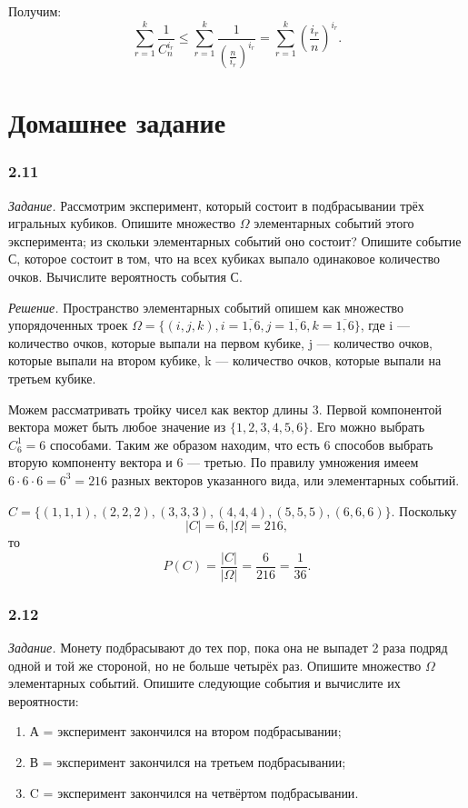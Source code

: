 Получим:
$$\sum \limits_{r=1}^k \frac{1}{C_n^{i_r}} \leq
\sum \limits_{r=1}^k \frac{1}{\left( \frac{n}{i_r} \right)^{i_r}} =
\sum \limits_{r=1}^k \left( \frac{i_r}{n} \right)^{i_r}. $$

\section*{Домашнее задание}

\subsubsection*{2.11}

\textit{Задание.} Рассмотрим эксперимент, который состоит в подбрасывании трёх игральных кубиков.
Опишите множество $ \Omega $ элементарных событий этого эксперимента; из скольки элементарных событий оно состоит?
Опишите событие С, которое состоит в том, что на всех кубиках выпало одинаковое количество очков.
Вычислите вероятность события С.

\textit{Решение.} Пространство элементарных событий опишем как множество упорядоченных троек
$ \Omega = \{ \left( i, j, k \right),
i = \overline{ 1, 6 },
j = \overline{ 1, 6 },
k = \overline{ 1, 6 } \} $,
где i --- количество очков, которые выпали на первом кубике,
j --- количество очков, которые выпали на втором кубике,
k --- количество очков, которые выпали на третьем кубике.

Можем рассматривать тройку чисел как вектор длины 3.
Первой компонентой вектора может быть любое значение из $ \{ 1, 2, 3, 4, 5, 6 \} $.
Его можно выбрать $ C_6^1 = 6 $ способами.
Таким же образом находим, что есть 6 способов выбрать вторую компоненту вектора и 6 --- третью.
По правилу умножения имеем $ 6 \cdot 6 \cdot 6 = 6^3 = 216 $ разных векторов указанного вида, или элементарных событий.

$ C = \{ (1, 1, 1), (2, 2, 2), (3, 3, 3), (4, 4, 4), (5, 5, 5), (6, 6, 6) \} $.
Поскольку
$$ |C| = 6,
|\Omega| = 216, $$
то
$$ P(C) =
\frac{ |C| }{ |\Omega| } =
\frac{ 6 }{ 216 } =
\frac{ 1 }{ 36 }.$$

\subsubsection*{2.12}

\textit{Задание.} Монету подбрасывают до тех пор, пока она не выпадет 2 раза подряд одной и той же стороной, но не больше четырёх раз.
Опишите множество $ \Omega $ элементарных событий.
Опишите следующие события и вычислите их вероятности:
\begin{enumerate}[label=\alph*)]
\item А = { эксперимент закончился на втором подбрасывании};
\item В = { эксперимент закончился на третьем подбрасывании};
\item C = { эксперимент закончился на четвёртом подбрасывании}.
\end{enumerate}


